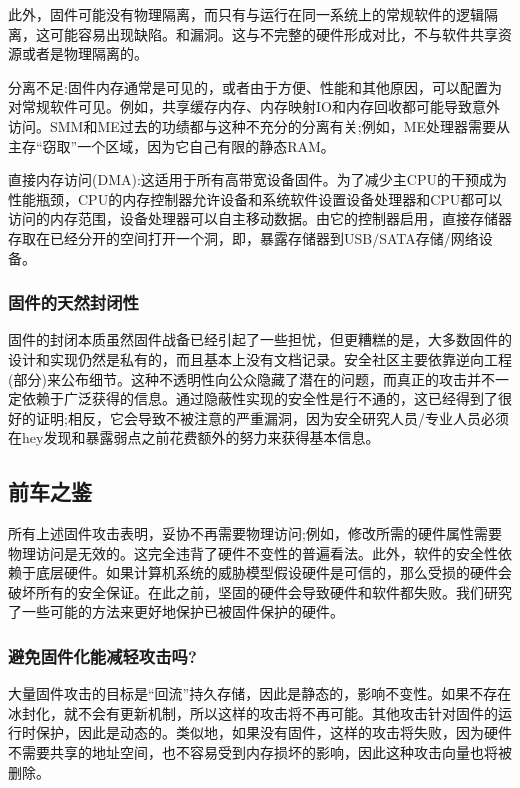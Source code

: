 此外，固件可能没有物理隔离，而只有与运行在同一系统上的常规软件的逻辑隔离，这可能容易出现缺陷。和漏洞。这与不完整的硬件形成对比，不与软件共享资源或者是物理隔离的。

分离不足:固件内存通常是可见的，或者由于方便、性能和其他原因，可以配置为对常规软件可见。例如，共享缓存内存、内存映射IO和内存回收都可能导致意外访问。SMM和ME过去的功绩都与这种不充分的分离有关;例如，ME处理器需要从主存“窃取”一个区域，因为它自己有限的静态RAM。

直接内存访问(DMA):这适用于所有高带宽设备固件。为了减少主CPU的干预成为性能瓶颈，CPU的内存控制器允许设备和系统软件设置设备处理器和CPU都可以访问的内存范围，设备处理器可以自主移动数据。由它的控制器启用，直接存储器存取在已经分开的空间打开一个洞，即，暴露存储器到USB/SATA存储/网络设备。

\subsubsection{固件的天然封闭性}

固件的封闭本质虽然固件战备已经引起了一些担忧，但更糟糕的是，大多数固件的设计和实现仍然是私有的，而且基本上没有文档记录。安全社区主要依靠逆向工程(部分)来公布细节。这种不透明性向公众隐藏了潜在的问题，而真正的攻击并不一定依赖于广泛获得的信息。通过隐蔽性实现的安全性是行不通的，这已经得到了很好的证明;相反，它会导致不被注意的严重漏洞，因为安全研究人员/专业人员必须在hey发现和暴露弱点之前花费额外的努力来获得基本信息。

\subsection{前车之鉴}

所有上述固件攻击表明，妥协不再需要物理访问;例如，修改所需的硬件属性需要物理访问是无效的。这完全违背了硬件不变性的普遍看法。此外，软件的安全性依赖于底层硬件。如果计算机系统的威胁模型假设硬件是可信的，那么受损的硬件会破坏所有的安全保证。在此之前，坚固的硬件会导致硬件和软件都失败。我们研究了一些可能的方法来更好地保护已被固件保护的硬件。

\subsubsection{避免固件化能减轻攻击吗?}

大量固件攻击的目标是“回流”持久存储，因此是静态的，影响不变性。如果不存在冰封化，就不会有更新机制，所以这样的攻击将不再可能。其他攻击针对固件的运行时保护，因此是动态的。类似地，如果没有固件，这样的攻击将失败，因为硬件不需要共享的地址空间，也不容易受到内存损坏的影响，因此这种攻击向量也将被删除。

